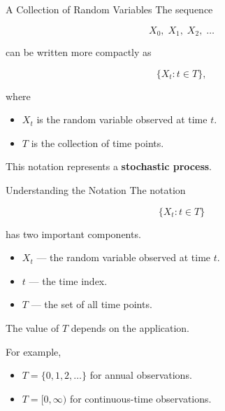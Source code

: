 \documentclass[
  ignorenonframetext,
  aspectratio=169,
]{beamer}
\providecommand{\tightlist}{%
  \setlength{\itemsep}{0pt}\setlength{\parskip}{0pt}}
\begin{document}
\begin{frame}{A Collection of Random Variables}
\protect{}\label{a-collection-of-random-variables}
The sequence

\[
X_0,\;X_1,\;X_2,\;\ldots
\]

can be written more compactly as

\[
\{X_t:t\in T\},
\]

where

\begin{itemize}
\tightlist
\item
  \(X_t\) is the random variable observed at time \(t\).
\item
  \(T\) is the collection of time points.
\end{itemize}

This notation represents a \textbf{stochastic process}.
\end{frame}

\begin{frame}{Understanding the Notation}
\protect{}\label{understanding-the-notation}
The notation

\[
\{X_t:t\in T\}
\]

has two important components.

\begin{itemize}
\tightlist
\item
  \textbf{\(X_t\)} --- the random variable observed at time \(t\).
\item
  \textbf{\(t\)} --- the time index.
\item
  \textbf{\(T\)} --- the set of all time points.
\end{itemize}

The value of \(T\) depends on the application.

For example,

\begin{itemize}
\tightlist
\item
  \(T=\{0,1,2,\ldots\}\) for annual observations.
\item
  \(T=[0,\infty)\) for continuous-time observations.
\end{itemize}
\end{frame}
\end{document}
